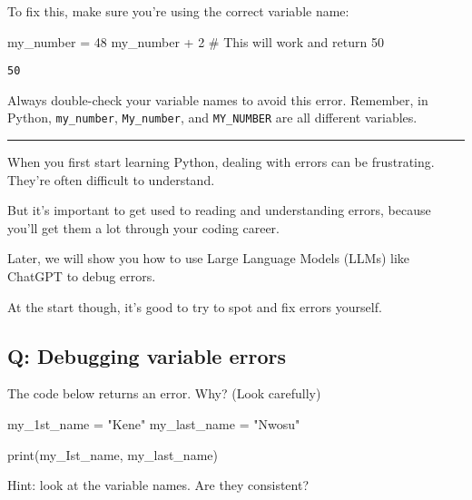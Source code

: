 \documentclass[
  letterpaper,
  DIV=11,
  numbers=noendperiod]{scrreprt}
\newenvironment{Shaded}{\begin{snugshade}}{\end{snugshade}}
\newcommand{\BuiltInTok}[1]{\textcolor[rgb]{0.00,0.23,0.31}{#1}}
\newcommand{\CommentTok}[1]{\textcolor[rgb]{0.37,0.37,0.37}{#1}}
\newcommand{\DecValTok}[1]{\textcolor[rgb]{0.68,0.00,0.00}{#1}}
\newcommand{\NormalTok}[1]{\textcolor[rgb]{0.00,0.23,0.31}{#1}}
\newcommand{\OperatorTok}[1]{\textcolor[rgb]{0.37,0.37,0.37}{#1}}
\newcommand{\StringTok}[1]{\textcolor[rgb]{0.13,0.47,0.30}{#1}}
\begin{document}
To fix this, make sure you're using the correct variable name:

\begin{Shaded}
\begin{Highlighting}[]
\NormalTok{my\_number }\OperatorTok{=} \DecValTok{48}
\NormalTok{my\_number }\OperatorTok{+} \DecValTok{2}  \CommentTok{\# This will work and return 50}
\end{Highlighting}
\end{Shaded}

\begin{verbatim}
50
\end{verbatim}

Always double-check your variable names to avoid this error. Remember,
in Python, \texttt{my\_number}, \texttt{My\_number}, and
\texttt{MY\_NUMBER} are all different variables.

\begin{center}\rule{0.5\linewidth}{0.5pt}\end{center}

When you first start learning Python, dealing with errors can be
frustrating. They're often difficult to understand.

But it's important to get used to reading and understanding errors,
because you'll get them a lot through your coding career.

Later, we will show you how to use Large Language Models (LLMs) like
ChatGPT to debug errors.

At the start though, it's good to try to spot and fix errors yourself.

\begin{tcolorbox}[enhanced jigsaw, colframe=quarto-callout-tip-color-frame, opacityback=0, titlerule=0mm, bottomrule=.15mm, breakable, leftrule=.75mm, colbacktitle=quarto-callout-tip-color!10!white, title=\textcolor{quarto-callout-tip-color}{\faLightbulb}\hspace{0.5em}{Practice}, rightrule=.15mm, coltitle=black, opacitybacktitle=0.6, colback=white, left=2mm, arc=.35mm, toptitle=1mm, bottomtitle=1mm, toprule=.15mm]

\subsection{Q: Debugging variable
errors}\label{q-debugging-variable-errors}

The code below returns an error. Why? (Look carefully)

\begin{Shaded}
\begin{Highlighting}[]
\NormalTok{my\_1st\_name }\OperatorTok{=} \StringTok{"Kene"}
\NormalTok{my\_last\_name }\OperatorTok{=} \StringTok{"Nwosu"}

\BuiltInTok{print}\NormalTok{(my\_Ist\_name, my\_last\_name)}
\end{Highlighting}
\end{Shaded}

Hint: look at the variable names. Are they consistent?

\end{tcolorbox}
\end{document}
